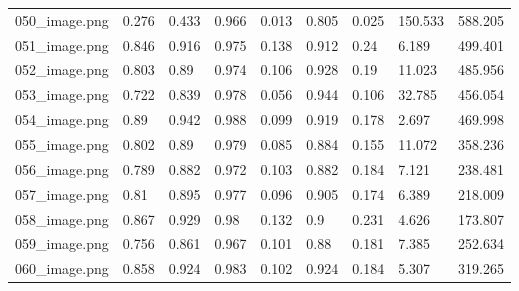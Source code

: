 \documentclass[runningheads]{llncs}
\begin{document}
\begin{table}[h!]
\begin{tabular}{|p{2.5cm}|p{1.0cm}|p{1.0cm}|p{1.0cm}|p{1.0cm}|p{1.0cm}|p{1.0cm}|p{1.0cm}|p{1.0cm}|}
050\_image.png & 0.276 & 0.433 & 0.966 & 0.013 & 0.805 & 0.025 & 150.533 & 588.205 \\
051\_image.png & 0.846 & 0.916 & 0.975 & 0.138 & 0.912 & 0.24 & 6.189 & 499.401 \\
052\_image.png & 0.803 & 0.89 & 0.974 & 0.106 & 0.928 & 0.19 & 11.023 & 485.956 \\
053\_image.png & 0.722 & 0.839 & 0.978 & 0.056 & 0.944 & 0.106 & 32.785 & 456.054 \\
054\_image.png & 0.89 & 0.942 & 0.988 & 0.099 & 0.919 & 0.178 & 2.697 & 469.998 \\
055\_image.png & 0.802 & 0.89 & 0.979 & 0.085 & 0.884 & 0.155 & 11.072 & 358.236 \\
056\_image.png & 0.789 & 0.882 & 0.972 & 0.103 & 0.882 & 0.184 & 7.121 & 238.481 \\
057\_image.png & 0.81 & 0.895 & 0.977 & 0.096 & 0.905 & 0.174 & 6.389 & 218.009 \\
058\_image.png & 0.867 & 0.929 & 0.98 & 0.132 & 0.9 & 0.231 & 4.626 & 173.807 \\
059\_image.png & 0.756 & 0.861 & 0.967 & 0.101 & 0.88 & 0.181 & 7.385 & 252.634 \\
060\_image.png & 0.858 & 0.924 & 0.983 & 0.102 & 0.924 & 0.184 & 5.307 & 319.265 \\
 \hline


\end{tabular}
\end{table}
\end{document}
